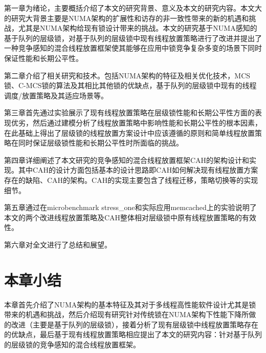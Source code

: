 第一章为绪论，主要概括介绍了本文的研究背景、意义及本文的研究内容。本文大的研究大背景主要是NUMA架构的扩展性和访存的非一致性带来的新的机遇和挑战，尤其是NUMA架构给现有锁设计带来的挑战。本文的研究基于NUMA感知的基于队列的层级锁，对基于队列的层级锁中现有线程放置策略进行了改进并提出了一种竞争感知的混合线程放置框架使其能够在应用中锁竞争复杂多变的场景下同时保证性能和长期公平性。

第二章介绍了相关研究和技术。包括NUMA架构的特征及相关优化技术，MCS锁、C-MCS锁的算法及其相比其他锁的优缺点，基于队列的层级锁中现有的线程调度/放置策略及其适应场景等。

第三章首先通过实验展示了现有线程放置策略在层级锁性能和长期公平性方面的表现优劣，然后通过建模分析了线程放置策略中影响性能和长期公平性的根本因素，在此基础上得出了层级锁的线程放置方案设计中应该遵循的原则和简单线程放置策略在同时保证层级锁性能和长期公平性时所面临的挑战。

第四章详细阐述了本文研究的竞争感知的混合线程放置框架CAH的架构设计和实现。其中CAH的设计方面包括基本的设计思路即CAH如何解决现有线程放置方案存在的缺陷、CAH的架构。CAH的实现主要包含了线程迁移，策略切换等的实现细节。

第五章通过在microbenchmark stress\_one和实际应用memcached上的实验说明了本文的两个改进线程放置策略及CAH整体相对层级锁中原有线程放置策略的有效性。

第六章对全文进行了总结和展望。
\section{本章小结}
本章首先介绍了NUMA架构的基本特征及其对于多线程高性能软件设计尤其是锁带来的机遇和挑战，然后介绍现有研究针对传统锁在NUMA架构下性能下降所做的改进（主要是基于队列的层级锁），接着分析了现有层级锁中线程放置策略存在的优缺点，最后基于现有线程放置策略相应提出了本文的研究内容：针对基于队列的层级锁的竞争感知的混合线程放置框架。